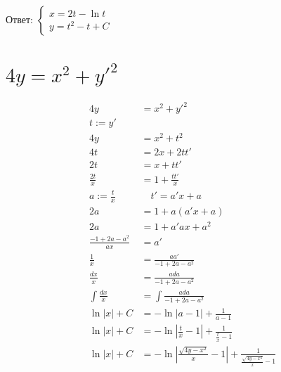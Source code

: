 Ответ: $\begin{cases}
        x = 2t - \ln t \\
        y = t^2 - t + C
    \end{cases}$

\section{$4y=x^2+y'^2$}

\begin{align*}
    4y                       & = x^2+y'^2                                                                                \\
    t := y'                                                                                                              \\
    4y                       & = x^2 + t^2                                                                               \\
    4t                       & = 2x + 2tt'                                                                               \\
    2t                       & = x + tt'                                                                                 \\
    \frac{2t}{x}             & = 1 + \frac{tt'}{x}                                                                       \\
    a := \frac{t}{x}         & \quad t' = a'x + a                                                                        \\
    2a                       & = 1 + a(a'x+a)                                                                            \\
    2a                       & = 1 + a'ax + a^2                                                                          \\
    \frac{-1 + 2a - a^2}{ax} & = a'                                                                                      \\
    \frac{1}{x}              & = \frac{aa'}{-1 + 2a - a^2}                                                               \\
    \frac{dx}{x}             & = \frac{ada}{-1 + 2a - a^2}                                                               \\
    \int \frac{dx}{x}        & = \int \frac{ada}{-1 + 2a - a^2}                                                          \\
    \ln|x| + C               & = -\ln |a - 1| + \frac{1}{a-1}         \tag{1}                                            \\
    \ln|x| + C               & = -\ln \left|\frac{t}{x} - 1\right| + \frac{1}{\frac{t}{x}-1}                             \\
    \ln|x| + C               & = -\ln \left|\frac{\sqrt{4y - x^2}}{x} - 1\right| + \frac{1}{\frac{\sqrt{4y - x^2}}{x}-1} \\
\end{align*}

